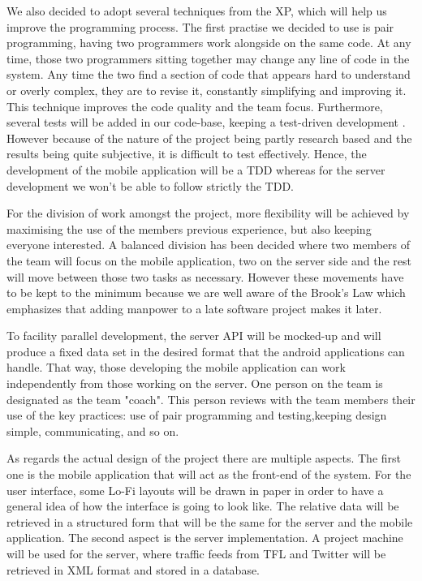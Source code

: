 We also decided to adopt several techniques from the XP, which will help us improve the programming process. The first practise we decided to use is pair programming, having two programmers work alongside on the same code. At any time, those two programmers sitting together may change any line of code in the system. Any time the two find a section of code that appears hard to understand or overly complex, they are to revise it, constantly simplifying and improving it. This technique improves the code quality and the team focus. Furthermore, several tests will be added in our code-base, keeping a test-driven development . However because of the nature of the project being partly research based and the results being quite subjective, it is difficult to test effectively. Hence, the development of the mobile application will be a TDD whereas for the server development we won't be able to follow strictly the TDD.\cite{Cockburn}

For the division of work amongst the project, more flexibility will be achieved by maximising the use of the members previous experience, but also keeping everyone interested. A balanced division has been decided where two members of the team will focus on the mobile application, two on the server side and the rest will move between those two tasks as necessary. However these movements have to be kept to the minimum because we are well aware of the Brook's Law which emphasizes that adding manpower to a late software project makes it later.\cite{Brooks}

To facility parallel development, the server API will be mocked-up and will produce a fixed data set in the desired format that the android applications can handle. That way, those developing the mobile application can work independently from those working on the server. One person on the team is designated as the team "coach". This person reviews with the team members their use of the key practices: use of pair programming and testing,keeping design simple, communicating, and so on.

As regards the actual design of the project there are multiple aspects. The first one is the mobile application that will act as the front-end of the system. For the user interface, some Lo-Fi layouts will be drawn in paper in order to have a general idea of how the interface is going to look like. The relative data will be retrieved in a structured form that will be the same for the server and the mobile application. The second aspect is the server implementation. A project machine will be used for the server, where traffic feeds from TFL and Twitter will be retrieved in XML format and stored in a database.
